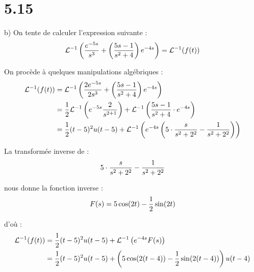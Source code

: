 \section*{5.15}

b) On tente de calculer l'expression suivante :
\begin{align*}
    \mathcal{L}^{-1}\left({\dfrac{e^{-5s}}{s^3} + \left({\dfrac{5s-1}{s^2+4}}\right)e^{-4s}}\right) = \mathcal{L}^{-1}{\left({f(t)}\right)}
\end{align*}

On procède à quelques manipulations algébriques :
\begin{align*}
    \mathcal{L}^{-1}{\left({f(t)}\right)}
    &= \mathcal{L}^{-1}\left({\dfrac{2e^{-5s}}{2s^3} + \left({\dfrac{5s-1}{s^2+4}}\right)e^{-4s}}\right) \\
    &= \dfrac{1}{2}\mathcal{L}^{-1}\left({e^{-5s}\dfrac{2}{s^{2+1}}}\right)
    + \mathcal{L}^{-1}\left({\dfrac{5s-1}{s^2+4}\cdot e^{-4s}}\right) \\
    &= \dfrac{1}{2}(t-5)^2 u(t-5)
    + \mathcal{L}^{-1}\left({e^{-4s}\left({5\cdot\dfrac{s}{s^2 + 2^2} -\dfrac{1}{s^2 + 2^2}}\right)}\right)
\end{align*}

La transformée inverse de :
\begin{align*}
    5\cdot\dfrac{s}{s^2 + 2^2} -\dfrac{1}{s^2 + 2^2}
\end{align*}

nous donne la fonction inverse :
\begin{align*}
    F(s) = 5\cos(2t) - \dfrac{1}{2}\sin(2t)
\end{align*}

d'où :
\begin{align*}
    \mathcal{L}^{-1}{\left({f(t)}\right)} &=
    \dfrac{1}{2}(t-5)^2 u(t-5)
    + \mathcal{L}^{-1}\left({e^{-4s}F(s)}\right) \\
    &= \dfrac{1}{2}(t-5)^2 u(t-5) +
    \left({5\cos(2(t-4)) - \dfrac{1}{2}\sin(2(t-4))}\right)u(t-4)
\end{align*}
